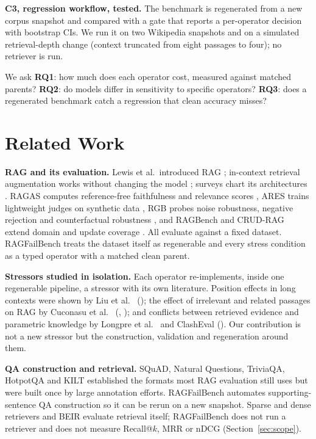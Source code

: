 \documentclass[conference]{IEEEtran}
\newcommand{\op}[1]{\texttt{\detokenize{#1}}}
\begin{document}
\textbf{C3, regression workflow, tested.} The benchmark is regenerated from a new corpus
snapshot and compared with a gate that reports a per-operator decision with bootstrap CIs. We
run it on two Wikipedia snapshots and on a simulated retrieval-depth change (context truncated
from eight passages to four); no retriever is run.

We ask \textbf{RQ1}: how much does each operator cost, measured against matched parents?
\textbf{RQ2}: do models differ in sensitivity to specific operators? \textbf{RQ3}: does a
regenerated benchmark catch a regression that clean accuracy misses?

\section{Related Work}
\textbf{RAG and its evaluation.} Lewis et al.\ introduced RAG \cite{lewis2020rag}; in-context
retrieval augmentation works without changing the model \cite{ram2023incontext}; surveys chart
its architectures \cite{gao2023survey,zhao2024survey,huang2024survey}. RAGAS computes
reference-free faithfulness and relevance scores \cite{es2024ragas}, ARES trains lightweight
judges on synthetic data \cite{saadfalcon2024ares}, RGB probes noise robustness, negative
rejection and counterfactual robustness \cite{chen2024rgb}, and RAGBench and CRUD-RAG extend
domain and update coverage \cite{friel2024ragbench,lyu2024crud}. All evaluate against a fixed
dataset. RAGFailBench treats the dataset itself as regenerable and every stress condition as a
typed operator with a matched clean parent.

\textbf{Stressors studied in isolation.} Each operator re-implements, inside one regenerable
pipeline, a stressor with its own literature. Position effects in long contexts were shown by
Liu et al.\ \cite{liu2024lost} (\op{evidence_position}); the effect of irrelevant and related
passages on RAG by Cuconasu et al.\ \cite{cuconasu2024noise} (\op{context_noise},
\op{hard_negative}); and conflicts between retrieved evidence and parametric knowledge by
Longpre et al.\ \cite{longpre2021entity} and ClashEval \cite{wu2024clasheval}
(\op{conflict}). Our contribution is not a new stressor but the construction, validation and
regeneration around them.

\textbf{QA construction and retrieval.} SQuAD, Natural Questions, TriviaQA, HotpotQA and KILT
established the formats most RAG evaluation still uses
\cite{rajpurkar2016squad,kwiatkowski2019nq,joshi2017triviaqa,yang2018hotpotqa,petroni2021kilt}
but were built once by large annotation efforts. RAGFailBench automates supporting-sentence QA
construction so it can be rerun on a new snapshot. Sparse and dense retrievers
\cite{robertson2009bm25,karpukhin2020dpr,izacard2022contriever,khattab2020colbert,santhanam2022colbertv2}
and BEIR \cite{thakur2021beir} evaluate retrieval itself; RAGFailBench does not run a retriever
and does not measure Recall@$k$, MRR or nDCG (Section~\ref{sec:scope}).
\end{document}
